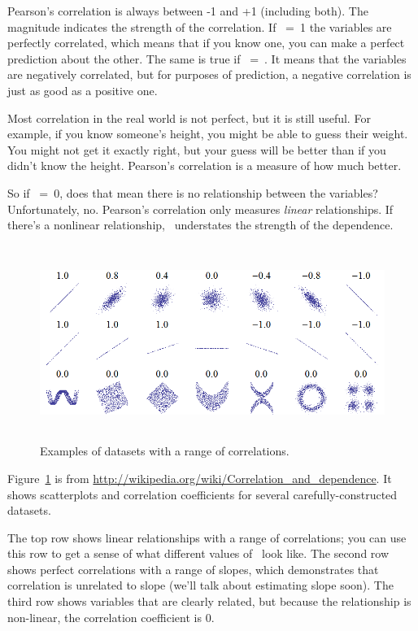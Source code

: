 \documentclass[12pt]{book}
\begin{document}
Pearson's correlation is always between -1 and +1 (including both).
The magnitude indicates the strength of the correlation.  If
\myrho~=~1 the variables are perfectly correlated, which means that if
you know one, you can make a perfect prediction about the other.  The
same is true if \myrho~=~.  It means that the variables
are negatively correlated, but for purposes of prediction, a
negative correlation is just as good as a positive one.

Most correlation in the real world is not perfect, but it
is still useful.  For example, if you know someone's height, you might
be able to guess their weight.  You might not get it exactly right, but
your guess will be better than if you didn't know the height.
Pearson's correlation is a measure of how much better.

So if \myrho~=~0, does that mean there is no
relationship between the variables?  Unfortunately, no.  Pearson's
correlation only measures {\em linear} relationships.  If there's a
nonlinear relationship, \myrho~understates the strength of the
dependence.

\begin{figure}
\centerline{\includegraphics[height=2.5in]{figs/Correlation_examples.png}}
\caption{Examples of datasets with a range of correlations.}
\label{corr_examples}
\end{figure}

Figure~\ref{corr_examples} is from
\url{http://wikipedia.org/wiki/Correlation_and_dependence}.  It shows
scatterplots and correlation coefficients for several
carefully-constructed datasets.

The top row shows linear relationships with a range of correlations;
you can use this row to get a sense of what different values of
\myrho~look like.  The second row shows perfect correlations with a
range of slopes, which demonstrates that correlation is unrelated to
slope (we'll talk about estimating slope soon).  The third row shows
variables that are clearly related, but because the relationship is
non-linear, the correlation coefficient is 0.
\end{document}
